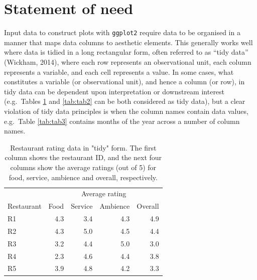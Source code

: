 \documentclass[10pt,a4paper,onecolumn]{article}
\begin{document}
\hypertarget{statement-of-need}{%
\section{Statement of need}\label{statement-of-need}}

Input data to construct plots with \texttt{ggplot2} require data to be
organised in a manner that maps data columns to aesthetic elements. This
generally works well where data is tidied in a long rectangular form,
often referred to as ``tidy data'' (Wickham, 2014), where each row
represents an observational unit, each column represents a variable, and
each cell represents a value. In some cases, what constitutes a variable
(or observational unit), and hence a column (or row), in tidy data can
be dependent upon interpretation or downstream interest (e.g.~Tables
\ref{tab:tab1} and \ref{tab:tab2} can be both considered as tidy data),
but a clear violation of tidy data principles is when the column names
contain data values, e.g.~Table \ref{tab:tab3} contains months of the
year across a number of column names.

\begin{table}

\caption{\label{tab:tab1}Restaurant rating data in "tidy" form. The first column shows the restaurant ID, and the next four columns show the average ratings (out of 5) for food, service, ambience and overall, respectively.}
\centering
\begin{tabular}[t]{lrrrr}
\toprule
\multicolumn{1}{c}{ } & \multicolumn{4}{c}{Average rating} \\
\cmidrule(l{3pt}r{3pt}){2-5}
Restaurant & Food & Service & Ambience & Overall\\
\midrule
R1 & 4.3 & 3.4 & 4.3 & 4.9\\
R2 & 4.3 & 5.0 & 4.5 & 4.4\\
R3 & 3.2 & 4.4 & 5.0 & 3.0\\
R4 & 2.3 & 4.6 & 4.4 & 3.8\\
R5 & 3.9 & 4.8 & 4.2 & 3.3\\
\bottomrule
\end{tabular}
\end{table}
\end{document}
